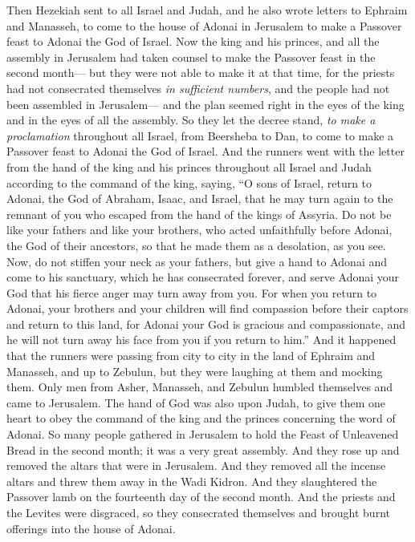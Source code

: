 \begin{biblechapter} %
 Then Hezekiah sent to all Israel and Judah, and he also wrote letters to Ephraim and Manasseh, to come to the house of Adonai in Jerusalem to make a Passover feast to Adonai the God of Israel.
\verse Now the king and his princes, and all the assembly in Jerusalem had taken counsel to make the Passover feast in the second month—
\verse but they were not able to make it at that time, for the priests had not consecrated themselves \textit{in sufficient numbers}, and the people had not been assembled in Jerusalem—
\verse and the plan seemed right in the eyes of the king and in the eyes of all the assembly.
\verse So they let the decree stand, \textit{to make a proclamation} throughout all Israel, from Beersheba to Dan, to come to make a Passover feast to Adonai the God of Israel.
\verse And the runners went with the letter from the hand of the king and his princes throughout all Israel and Judah according to the command of the king, saying, “O sons of Israel, return to Adonai, the God of Abraham, Isaac, and Israel, that he may turn again to the remnant of you who escaped from the hand of the kings of Assyria.
\verse Do not be like your fathers and like your brothers, who acted unfaithfully before Adonai, the God of their ancestors, so that he made them as a desolation, as you see.
\verse Now, do not stiffen your neck as your fathers, but give a hand to Adonai and come to his sanctuary, which he has consecrated forever, and serve Adonai your God that his fierce anger may turn away from you.
\verse For when you return to Adonai, your brothers and your children will find compassion before their captors and return to this land, for Adonai your God is gracious and compassionate, and he will not turn away his face from you if you return to him.”
\verse And it happened that the runners were passing from city to city in the land of Ephraim and Manasseh, and up to Zebulun, but they were laughing at them and mocking them.
\verse Only men from Asher, Manasseh, and Zebulun humbled themselves and came to Jerusalem.
\verse The hand of God was also upon Judah, to give them one heart to obey the command of the king and the princes concerning the word of Adonai.
\verse So many people gathered in Jerusalem to hold the Feast of Unleavened Bread in the second month; it was a very great assembly.
\verse And they rose up and removed the altars that were in Jerusalem. And they removed all the incense altars and threw them away in the Wadi Kidron.
\verse And they slaughtered the Passover lamb on the fourteenth day of the second month. And the priests and the Levites were disgraced, so they consecrated themselves and brought burnt offerings into the house of Adonai.

\end{biblechapter}
